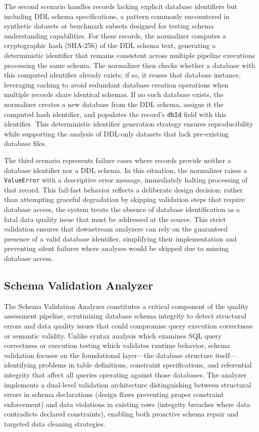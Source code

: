 \documentclass[]{einformatica}
\begin{document}
The second scenario handles records lacking explicit database identifiers but including DDL schema specifications, a pattern commonly encountered in synthetic datasets or benchmark subsets designed for testing schema understanding capabilities. For these records, the normalizer computes a cryptographic hash (SHA-256) of the DDL schema text, generating a deterministic identifier that remains consistent across multiple pipeline executions processing the same schema. The normalizer then checks whether a database with this computed identifier already exists; if so, it reuses that database instance, leveraging caching to avoid redundant database creation operations when multiple records share identical schemas. If no such database exists, the normalizer creates a new database from the DDL schema, assigns it the computed hash identifier, and populates the record's \texttt{dbId} field with this identifier. This deterministic identifier generation strategy ensures reproducibility while supporting the analysis of DDL-only datasets that lack pre-existing database files.

The third scenario represents failure cases where records provide neither a database identifier nor a DDL schema. In this situation, the normalizer raises a \texttt{ValueError} with a descriptive error message, immediately halting processing of that record. This fail-fast behavior reflects a deliberate design decision: rather than attempting graceful degradation by skipping validation steps that require database access, the system treats the absence of database identification as a fatal data quality issue that must be addressed at the source. This strict validation ensures that downstream analyzers can rely on the guaranteed presence of a valid database identifier, simplifying their implementation and preventing silent failures where analyses would be skipped due to missing database access.

\subsection{Schema Validation Analyzer}\label{sec:schema_analyzer}

The Schema Validation Analyzer constitutes a critical component of the quality assessment pipeline, scrutinizing database schema integrity to detect structural errors and data quality issues that could compromise query execution correctness or semantic validity. Unlike syntax analysis which examines SQL query correctness or execution testing which validates runtime behavior, schema validation focuses on the foundational layer---the database structure itself---identifying problems in table definitions, constraint specifications, and referential integrity that affect all queries operating against those databases. The analyzer implements a dual-level validation architecture distinguishing between structural errors in schema declarations (design flaws preventing proper constraint enforcement) and data violations in existing rows (integrity breaches where data contradicts declared constraints), enabling both proactive schema repair and targeted data cleaning strategies.
\end{document}

